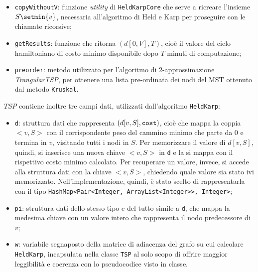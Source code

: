 \begin{itemize}
	\begin{itemize}
		\item \texttt{copyWithoutV}: funzione \textit{utility} di \texttt{HeldKarpCore} che serve a ricreare l'insieme $S\setmin \{v\}$, necessaria all'algoritmo di Held e Karp per proseguire con le chiamate ricorsive;
		\item \texttt{getResults}: funzione che ritorna $\left(d[0,V], T\right)$, cioè il valore del ciclo hamiltoniano di costo minimo disponibile dopo $T$ minuti di computazione;
		\item \texttt{preorder}: metodo utilizzato per l'algoritmo di 2-approssimazione \textit{TrangularTSP}, per ottenere una lista pre-ordinata dei nodi del MST ottenuto dal metodo \texttt{Kruskal}.
	\end{itemize}
	\textit{TSP} contiene inoltre tre campi dati, utilizzati dall'algoritmo \texttt{HeldKarp}:
	\begin{itemize}
		\item \texttt{d}: struttura dati che rappresenta $\left(d[v, S],\text{\texttt{cost}}\right)$, cioè che mappa la coppia $<\!\!v, S\!\!>$ con il corrispondente peso del cammino minimo che parte da 0 e termina in $v$, visitando tutti i nodi in $S$. Per memorizzare il valore di $d[v,S]$, quindi, si inserisce una nuova chiave $<\!\!v, S\!\!>$ in \texttt{d} e la si mappa con il rispettivo costo minimo calcolato. Per recuperare un valore, invece, si accede alla struttura dati con la chiave $<\!\!v, S\!\!>$, chiedendo quale valore sia stato ivi memorizzato. Nell'implementazione, quindi, è stato scelto di rappresentarla con il tipo \texttt{HashMap<Pair<Integer, ArrayList<Integer>>, Integer>};
		\item \texttt{pi}: struttura dati dello stesso tipo e del tutto simile a \texttt{d}, che mappa la medesima chiave con un valore intero che rappresenta il nodo predecessore di $v$;
		\item \texttt{w}: variabile segnaposto della matrice di adiacenza del grafo su cui calcolare \texttt{HeldKarp}, incapsulata nella classe \texttt{TSP} al solo scopo di offrire maggior leggibilità e coerenza con lo pseudocodice visto in classe.
	\end{itemize}
\end{itemize} 

